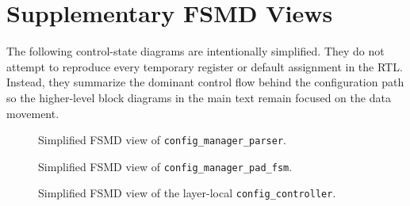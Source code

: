 \appendix

\section{Supplementary FSMD Views}

The following control-state diagrams are intentionally simplified. They do not
attempt to reproduce every temporary register or default assignment in the RTL.
Instead, they summarize the dominant control flow behind the configuration path
so the higher-level block diagrams in the main text remain focused on the data
movement.

\begin{figure}[t]
  \centering
  \resizebox{0.88\columnwidth}{!}{}
  \caption{Simplified FSMD view of \texttt{config\_manager\_parser}.}
  \label{fig:parser-fsmd}
\end{figure}

\begin{figure}[t]
  \centering
  \resizebox{0.88\columnwidth}{!}{}
  \caption{Simplified FSMD view of \texttt{config\_manager\_pad\_fsm}.}
  \label{fig:pad-fsmd}
\end{figure}

\begin{figure}[t]
  \centering
  \resizebox{0.88\columnwidth}{!}{}
  \caption{Simplified FSMD view of the layer-local \texttt{config\_controller}.}
  \label{fig:config-controller-fsmd}
\end{figure}
